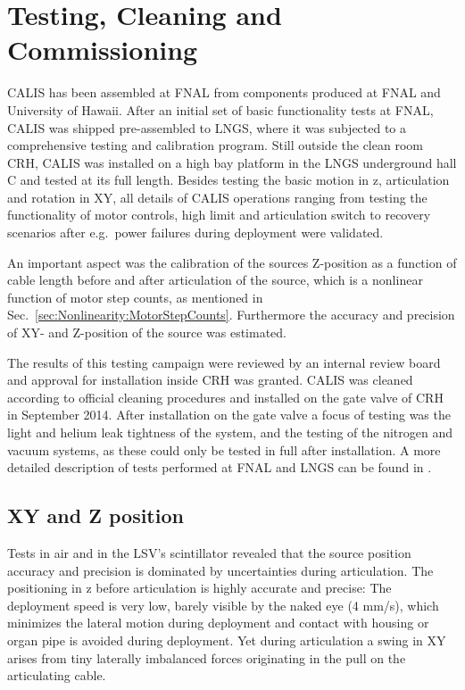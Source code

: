 \section{Testing, Cleaning and Commissioning} \label{sec:Testing}\label{sec:Commissioning}
CALIS has been assembled at FNAL from components produced at FNAL and University of Hawaii. After an initial set of basic functionality tests at FNAL, CALIS was shipped pre-assembled to LNGS, where it was subjected to a comprehensive testing and calibration program. Still outside the clean room CRH, CALIS was installed on a high bay platform in the LNGS underground hall C and tested at its full length. Besides testing the basic motion in z, articulation and rotation in XY, all details of CALIS operations ranging from testing the functionality of motor controls, high limit and articulation switch to recovery scenarios after e.g.~power failures during deployment were validated.

An important aspect was the calibration of the sources Z-position as a function of cable length before and after articulation of the source, which is a nonlinear function of motor step counts, as mentioned in Sec.~\ref{sec:Nonlinearity:MotorStepCounts}. Furthermore the accuracy and precision of XY- and Z-position of the source was estimated.

The results of this testing campaign were reviewed by an internal review board and approval for installation inside CRH was granted. CALIS was cleaned according to official cleaning procedures and installed on the gate valve of CRH in September 2014.
After installation on the gate valve a focus of testing was the light and helium leak tightness of the system, and the testing of the nitrogen and vacuum systems, as these could only be tested in full after installation. A more detailed description of tests performed at FNAL and LNGS can be found in \cite{thesis:Hackett, thesis:Edkins}.

\subsection*{XY and Z position}
Tests in air and in the LSV's scintillator revealed that the source position accuracy and precision is dominated by uncertainties during articulation. The positioning in z before articulation is highly accurate and precise: The deployment speed is very low, barely visible by the naked eye (4 mm/s), which minimizes the lateral motion during deployment and contact with housing or organ pipe is avoided during deployment. Yet during articulation a swing in XY arises from tiny laterally imbalanced forces originating in the pull on the articulating cable. 

